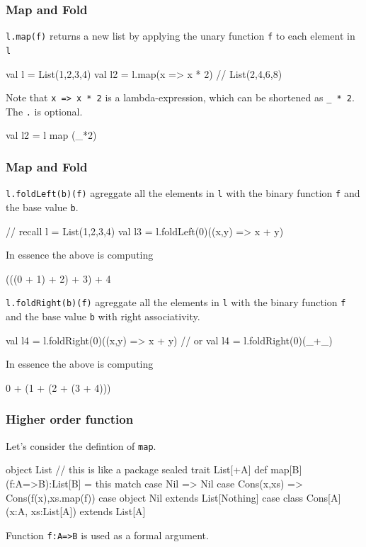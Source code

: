 \documentclass{beamer}
\newcommand{\beb}{\begin{exampleblock}}
\newcommand{\eeb}{\end{exampleblock}}
\begin{document}
\begin{frame}[fragile]
\frametitle{Map and Fold}
{\tt l.map(f)} returns a new list by applying the unary function {\tt f} to each
element in {\tt l}
\beb{}
\begin{code}
val l = List(1,2,3,4)
val l2 = l.map(x => x * 2) // List(2,4,6,8)
\end{code}
\eeb
%
Note that {\tt x => x * 2} is a lambda-expression, which can be
shortened as {\tt \_ * 2}. The {\tt .} is optional.
\beb{}
\begin{code}
val l2 = l map (_*2) 
\end{code}
\eeb
\end{frame}

\begin{frame}[fragile]
\frametitle{Map and Fold}

{\tt l.foldLeft(b)(f)} agreggate all the
elements in {\tt l} with the binary function {\tt f} and the base value
{\tt b}.
\beb{}
\begin{code}
// recall l = List(1,2,3,4)
val l3 = l.foldLeft(0)((x,y) => x + y)
\end{code}
\eeb
In essence the above is computing 
\begin{code}
(((0 + 1) + 2) + 3) + 4
\end{code}
{\tt l.foldRight(b)(f)} agreggate all the
elements in {\tt l} with the binary function {\tt f} and the base value
{\tt b} with right associativity.
\beb{}
\begin{code}
val l4 = l.foldRight(0)((x,y) => x + y) 
// or val l4 =  l.foldRight(0)(_+_) 
\end{code}
\eeb
In essence the above is computing 
\begin{code}
0 + (1 + (2 + (3 + 4)))
\end{code}

\end{frame}

\begin{frame}[fragile]
\frametitle{Higher order function}
Let's consider the defintion of {\tt map}.

\beb{}
\begin{code}
object List { // this is like a package
    sealed trait List[+A] {
        def map[B](f:A=>B):List[B] = this match {
            case Nil => Nil
            case Cons(x,xs) => Cons(f(x),xs.map(f))
        }
    }
    case object Nil extends List[Nothing]
    case class Cons[A](x:A, xs:List[A]) extends List[A]
}
\end{code}
\eeb
Function {\tt f:A=>B} is used as a formal argument.
\end{frame}
\end{document}
